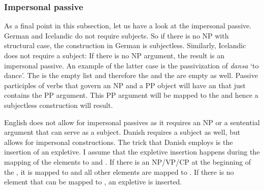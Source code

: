 \subsubsection{Impersonal passive}
\label{sec-impersonals}

\largerpage
As a final point in this subsection, let us have a look at the impersonal passive. German and
Icelandic do not require subjects. So if there is no NP with structural case, the construction in
German is subjectless. Similarly, Icelandic does not require a subject: If there is no NP argument,
the result is an impersonal passive. An example of the latter case is the passivization of
\emph{dansa} `to dance'. The \argstl is the empty list and therefore the \sprl and the \compsl are
empty as well. Passive participles of verbs that govern an NP and a PP object will have an \argstl
that just contains the PP argument. This PP argument will be mapped to the \compsl and hence a
subjectless construction will result.


English does not allow for impersonal passives as it requires an NP or a sentential argument that
can serve as a subject. Danish requires a subject as well, but allows for impersonal
constructions. The trick that Danish employs is the insertion of an expletive. I assume that the
expletive insertion happens during the mapping of the \argst elements to \spr and \comps. If there
is an NP/VP/CP at the beginning of the \argstl, it is mapped to \spr and all other elements are
mapped to \comps. If there is no element that can be mapped to \spr, an expletive is inserted.%
\nocite{BB2007a}

